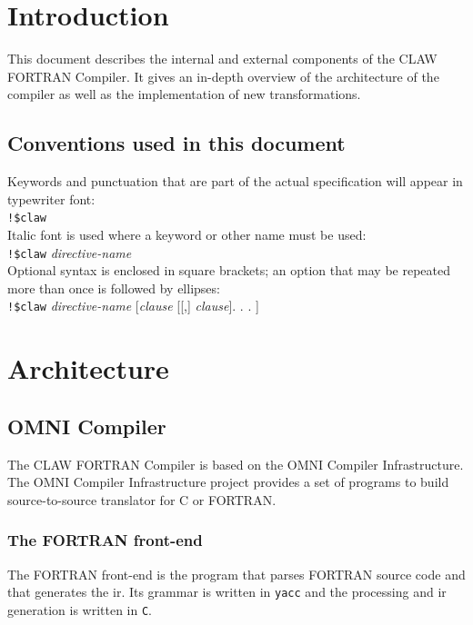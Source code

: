 \documentclass[a4paper, 11pt]{report}
\def\clawfcomp{CLAW FORTRAN Compiler\xspace}
\def\omni{OMNI Compiler Infrastructure\xspace}
\newcommand{\emptypage}{}
\begin{document}
\emptypage
\pagebreak
\tableofcontents

\chapter*{Introduction}
This document describes the internal and external components of the \clawfcomp. It gives an in-depth overview of the architecture of the compiler as well as the implementation of new transformations. 

\section*{Conventions used in this document}

Keywords and punctuation that are part of the actual specification will appear in typewriter font: \\

\lstinline|!$claw|\\

Italic font is used where a keyword or other name must be used: \\

\lstinline|!$claw| \textit{directive-name}\\

Optional syntax is enclosed in square brackets; an option that may be repeated more than once is
followed by ellipses:\\

\lstinline|!$claw| \textit{directive-name} [\textit{clause} [[,] \textit{clause}]. . . ]


\chapter{Architecture}
\section{OMNI Compiler}
The \clawfcomp is based on the \omni\cite{omni:website}. The \omni project provides a set of programs to build source-to-source translator for C or FORTRAN.

\subsection{The FORTRAN front-end}
The FORTRAN front-end is the program that parses FORTRAN source code and that generates the \gls{ir}. Its grammar is written in \lstinline|yacc| and the processing and \gls{ir} generation is written in \lstinline|C|.
\end{document}
